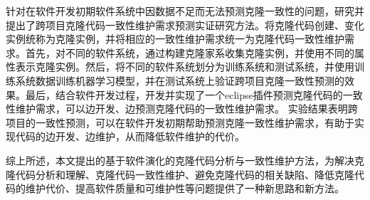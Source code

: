 {针对在软件开发初期软件系统中因数据不足而无法预测克隆一致性的问题，研究并提出了跨项目克隆代码一致性维护需求预测实证研究方法。将克隆代码创建、变化实例统称为克隆实例，并将相应的一致性维护需求统一为克隆代码一致性维护需求。首先，对不同的软件系统，通过构建克隆家系收集克隆实例，并使用不同的属性表示克隆实例。然后，将不同的软件系统划分为训练系统和测试系统，并使用训练系统数据训练机器学习模型，并在测试系统上验证跨项目克隆一致性预测的效果。最后，结合软件开发过程，开发并实现了一个eclipse插件预测克隆代码的一致性维护需求，可以边开发、边预测克隆代码的一致性维护需求。 实验结果表明跨项目的一致性预测，可以在软件开发初期帮助预测克隆一致性维护需求，有助于实现代码的边开发、边维护，从而降低软件维护的代价。%

综上所述，本文提出的基于软件演化的克隆代码分析与一致性维护方法，为解决克隆代码分析和理解、克隆代码一致性维护、避免克隆代码的相关缺陷、降低克隆代码的维护代价、提高软件质量和可维护性等问题提供了一种新思路和新方法。
}


